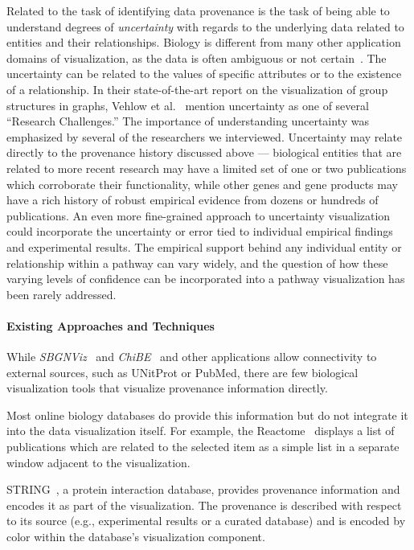 \documentclass[twocolumn]{bmcart}%
\begin{document}
Related to the task of identifying data provenance is the task of being able to understand degrees of \textit{uncertainty} with regards to the underlying data related to entities and their relationships.
Biology is different from many other application domains of visualization, as the data is often ambiguous or not certain~\cite{kohlbacher2014multivariate}.
The uncertainty can be related to the values of specific attributes or to the existence of a relationship.
In their state-of-the-art report on the visualization of group structures in graphs, Vehlow et al.~\cite{vehlow2015state} mention uncertainty as one of several ``Research Challenges.''
The importance of understanding uncertainty was emphasized by several of the researchers we interviewed.
Uncertainty may relate directly to the provenance history discussed above --- biological entities that are related to more recent research may have a limited set of one or two publications which corroborate their functionality, while other genes and gene products may have a rich history of robust empirical evidence from dozens or hundreds of publications.
An even more fine-grained approach to uncertainty visualization could incorporate the uncertainty or error tied to individual empirical findings and experimental results.
The empirical support behind any individual entity or relationship within a pathway can vary widely, and the question of how these varying levels of confidence can be incorporated into a pathway visualization has been rarely addressed.

\paragraph*{Existing Approaches and Techniques}

While \textit{SBGNViz}~\cite{SBGNViz2015} and \textit{ChiBE}~\cite{Babur2010chibe} and other applications allow connectivity to external sources, such as UNitProt or PubMed, there are few biological visualization tools that visualize provenance information directly.

Most online biology databases do provide this information but do not integrate it into the data visualization itself.
For example, the Reactome~\cite{croft2014reactome} displays a list of publications which are related to the selected item as a simple list in a separate window adjacent to the visualization.

STRING~\cite{STRING2005}, a protein interaction database, provides provenance information and encodes it as part of the visualization.
The provenance is described with respect to its source (e.g., experimental results or a curated database) and is encoded by color within the database's visualization component.
\end{document}
